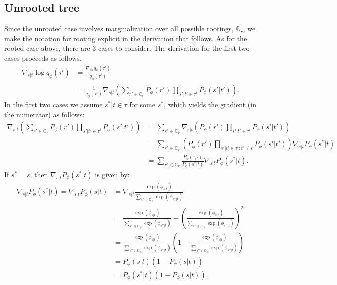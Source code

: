 \documentclass{article}
\begin{document}
\subsection*{Unrooted tree}
Since the unrooted case involves marginalization over all possible rootings, $\mathbb{C}_r$, we make the notation for rooting explicit in the derivation that follows.
As for the rooted case above, there are 3 cases to consider.
The derivation for the first two cases proceeds as follows.
\begin{align*}
    \nabla_{s|t} \log q_{\phi}(\tau^i)
    &= \frac{\nabla_{s|t} q_{\phi}(\tau^i)}{q_{\phi}(\tau^i)} \\
    &= \frac{1}{q_{\phi}(\tau^i)} \nabla_{s|t} \left( \sum\limits_{r' \in \mathbb{C}_{r}} P_{\phi}(r') \prod\limits_{s'|t' \in \tau^i} P_{\phi}(s' | t') \right).
\end{align*}
In the first two cases we assume $s^*|t \in \tau$ for some $s^*$, which yields the gradient (in the numerator) as follows:
\begin{align*}
    \nabla_{s|t} \left( \sum\limits_{r' \in \mathbb{C}_{r}} P_{\phi}(r') \prod\limits_{s'|t' \in \tau^i} P_{\phi}(s' | t') \right) &= \sum\limits_{r' \in \mathbb{C}_{r}} \nabla_{s|t} \left( P_{\phi}(r') \prod\limits_{s'|t' \in \tau^i} P_{\phi}(s' | t') \right) \\
    &= \sum\limits_{r' \in \mathbb{C}_{r}} \left( P_{\phi}(r') \prod\limits_{s'|t' \in \tau^i : t' \not= t } P_{\phi}(s' | t') \right) \nabla_{s|t} P_{\phi}(s^*|t) \\
    &= \sum\limits_{r' \in \mathbb{C}_{r}} \frac{P_\phi(\tau_{r'})}{P_{\phi}(s^*|t)} \nabla_{s|t} P_{\phi}(s^*|t).
\end{align*}
If $s^* = s$, then $\nabla_{s|t} P_{\phi}(s^*|t)$ is given by:
\begin{align*}
    \nabla_{s|t} P_{\phi}(s^*|t) = \nabla_{s|t} P_{\phi}(s|t) &= \nabla_{s|t} \frac{\exp(\phi_{s|t})}{\sum\limits_{s'' \in \mathbb{C}_{.|t}} \exp(\phi_{s''|t})} \\
    &= \frac{\exp(\phi_{s|t})}{\sum\limits_{s'' \in \mathbb{C}_{.|t}} \exp(\phi_{s''|t})} - \left(\frac{\exp(\phi_{s|t})}{\sum\limits_{s'' \in \mathbb{C}_{.|t}} \exp(\phi_{s''|t})}\right)^2 \\
    &= \frac{\exp(\phi_{s|t})}{\sum\limits_{s'' \in \mathbb{C}_{.|t}} \exp(\phi_{s''|t})} \left(1 - \frac{\exp(\phi_{s|t})}{\sum\limits_{s'' \in \mathbb{C}_{.|t}} \exp(\phi_{s''|t})}\right) \\
    &= P_{\phi}(s|t) (1 - P_{\phi}(s|t)) \\
    &= P_{\phi}(s^*|t) (1 - P_{\phi}(s|t)).
\end{align*}
\end{document}
